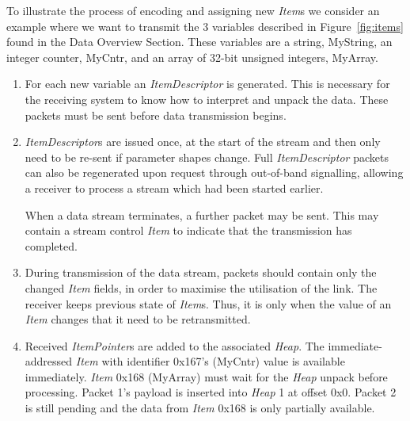 \documentclass[11pt,english,twoside]{article}
\begin{document}
To illustrate the process of encoding and assigning new \emph{Item}s we consider an example where we want to transmit the 3 variables described
in Figure~\ref{fig:items} found in the Data Overview Section. These variables are a string, MyString, an integer counter, MyCntr, and an array
of 32-bit unsigned integers, MyArray.
\begin{enumerate}
\item For each new variable an \emph{ItemDescriptor} is generated. This is necessary for the receiving system to know how to interpret and
unpack the data. These packets must be sent before data transmission begins.

\item \emph{ItemDescriptor}s are issued once, at the start of the stream and then only need to be re-sent if parameter shapes change. Full
\emph{ItemDescriptor} packets can also be regenerated upon request through out-of-band signalling, allowing a receiver to process a stream which
had been started earlier.

When a data stream terminates, a further packet may be sent. This may contain a stream control \emph{Item} to indicate that the transmission has
completed.

\item During transmission of the data stream, packets should contain only the changed \emph{Item} fields, in order to maximise the utilisation
of the link. The receiver keeps previous state of \emph{Item}s. Thus, it is only when the value of an \emph{Item} changes that it need to be
retransmitted.

\item Received \emph{ItemPointer}s are added to the associated \emph{Heap}. The immediate-addressed \emph{Item} with identifier 0x167's (MyCntr)
value is available immediately. \emph{Item} 0x168 (MyArray) must wait for the \emph{Heap} unpack before processing. Packet 1's payload is
inserted into \emph{Heap} 1 at offset 0x0. Packet 2 is still pending and the data from \emph{Item} 0x168 is only partially available.
\end{enumerate}
\end{document}
